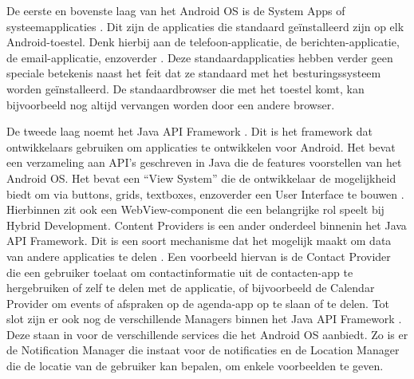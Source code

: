 De eerste en bovenste laag van het Android OS is de System Apps of systeemapplicaties \autocite{Bron7, Bron13}. Dit zijn de applicaties die standaard geïnstalleerd zijn op elk Android-toestel. Denk hierbij aan de telefoon-applicatie, de berichten-applicatie, de email-applicatie, enzoverder \autocite{Bron7}. Deze standaardapplicaties hebben verder geen speciale betekenis naast het feit dat ze standaard met het besturingssysteem worden geïnstalleerd. De standaardbrowser die met het toestel komt, kan bijvoorbeeld nog altijd vervangen worden door een andere browser.

De tweede laag noemt het Java API Framework \autocite{Bron7}. Dit is het framework dat ontwikkelaars gebruiken om applicaties te ontwikkelen voor Android. Het bevat een verzameling aan API's geschreven in Java die de features voorstellen van het Android OS. Het bevat een ``View System'' die de ontwikkelaar de mogelijkheid biedt om via buttons, grids, textboxes, enzoverder een User Interface te bouwen \autocite{Bron7, Bron13}. Hierbinnen zit ook een WebView-component die een belangrijke rol speelt bij Hybrid Development. Content Providers is een ander onderdeel binnenin het Java API Framework. Dit is een soort mechanisme dat het mogelijk maakt om data van andere applicaties te delen \autocite{Bron7}. Een voorbeeld hiervan is de Contact Provider die een gebruiker toelaat om contactinformatie uit de contacten-app te hergebruiken of zelf te delen met de applicatie, of bijvoorbeeld de Calendar Provider om events of afspraken op de agenda-app op te slaan of te delen. Tot slot zijn er ook nog de verschillende Managers binnen het Java API Framework \autocite{Bron7}. Deze staan in voor de verschillende services die het Android OS aanbiedt. Zo is er de Notification Manager die instaat voor de notificaties en de Location Manager die de locatie van de gebruiker kan bepalen, om enkele voorbeelden te geven.

